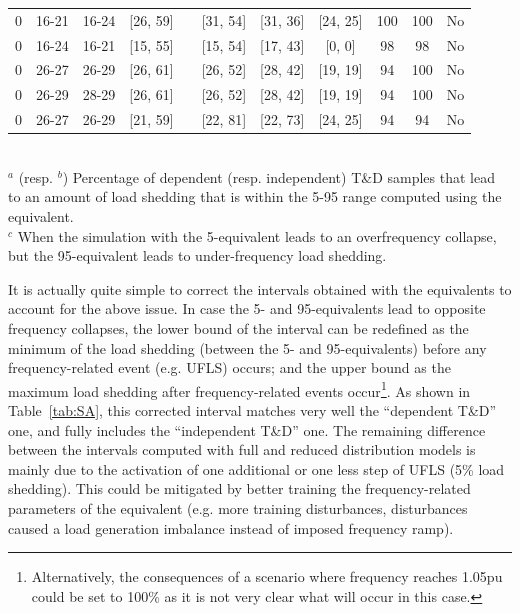 {\begin{landscape}
\begin{table}
{\begin{tabular}{@{}ccccccccccc@{}}
0   & 16-21 & 16-24 & [26, 59] & & [31, 54] & [31, 36] & [24, 25]  & 100 & 100 & No  \\
0   & 16-24 & 16-21 & [15, 55] & & [15, 54] & [17, 43] & [0, 0]  & 98  & 98  & No  \\
0   & 26-27 & 26-29 & [26, 61] & & [26, 52] & [28, 42] & [19, 19]  & 94  & 100 & No  \\
0   & 26-29 & 28-29 & [26, 61] & & [26, 52] & [28, 42] & [19, 19]  & 94  & 100 & No  \\
0   & 26-27 & 26-29 & [21, 59] & & [22, 81] & [22, 73] & [24, 25]  & 94  & 94  & No  \\ \bottomrule
\end{tabular}
} \\ \vspace{0.1cm}
\footnotesize{\(^a\) (resp. \(^b\)) Percentage of dependent (resp. independent) T\&D samples that lead to an amount of load shedding that is within the 5-95 range computed using the equivalent. \\$^c$ When the simulation with the 5-equivalent leads to an overfrequency collapse, but the 95-equivalent leads to under-frequency load shedding.}
\end{table}
\end{landscape}
\clearpage%
}

It is actually quite simple to correct the intervals obtained with the equivalents to account for the above issue. In case the 5- and 95-equivalents lead to opposite frequency collapses, the lower bound of the interval can be redefined as the minimum of the load shedding (between the 5- and 95-equivalents) before any frequency-related event (e.g. UFLS) occurs; and the upper bound as the maximum load shedding after frequency-related events occur\footnote{Alternatively, the consequences of a scenario where frequency reaches 1.05pu could be set to 100\% as it is not very clear what will occur in this case.}. As shown in Table~\ref{tab:SA}, this corrected interval matches very well the ``dependent T\&D'' one, and fully includes the ``independent T\&D'' one. The remaining difference between the intervals computed with full and reduced distribution models is mainly due to the activation of one additional or one less step of UFLS (5\% load shedding). This could be mitigated by better training the frequency-related parameters of the equivalent (e.g. more training disturbances, disturbances caused a load generation imbalance instead of imposed frequency ramp).


